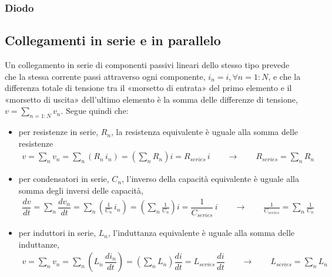 \documentclass[letterpaper,10pt,italian]{jupyterBook}
\begin{document}
\subsubsection{Diodo}
\label{\detokenize{ch/electromagnetism/circuits-electric:diodo}}\label{\detokenize{ch/electromagnetism/circuits-electric:physics-hs-electromagnetism-circuits-electric-components-diode}}
\sphinxAtStartPar
{}


\subsection{Collegamenti in serie e in parallelo}
\label{\detokenize{ch/electromagnetism/circuits-electric:collegamenti-in-serie-e-in-parallelo}}\label{\detokenize{ch/electromagnetism/circuits-electric:physics-hs-electromagnetism-circuits-electric-components-configurations}}
\sphinxAtStartPar
{} Un collegamento in serie di componenti passivi lineari dello stesso tipo prevede che la stessa corrente passi attraverso ogni componente, \(i_n = i, \forall n=1:N\), e che la differenza totale di tensione tra il «morsetto di entrata» del primo elemento e il «morsetto di uscita» dell’ultimo elemento è la somma delle differenze di tensione, \(v = \sum_{n=1:N} v_n\). Segue quindi che:
\begin{itemize}
\item {} 
\sphinxAtStartPar
per resistenze in serie, \(R_n\), la resistenza equivalente è uguale alla somma delle resistenze
\begin{equation*}
\begin{split}v = \sum_n v_n = \sum_n \left( R_n \, i_n \right) = \left( \sum_n R_n \right) i = R_{series} \, i \qquad \rightarrow \qquad R_{series} = \sum_n R_n\end{split}
\end{equation*}
\item {} 
\sphinxAtStartPar
per condensatori in serie, \(C_n\), l’inverso della capacità equivalente è uguale alla somma degli inversi delle capacità,
\begin{equation*}
\begin{split}\dfrac{d v}{dt} = \sum_n \dfrac{d v_n}{dt} = \sum_n \left( \frac{1}{C_n} \, i_n \right) = \left( \sum_n \frac{1}{C_n} \right) i = \dfrac{1}{C_{series}} \, i \qquad \rightarrow \qquad \frac{1}{C_{series}} = \sum_n \frac{1}{C_n}\end{split}
\end{equation*}
\item {} 
\sphinxAtStartPar
per induttori in serie, \(L_n\), l’induttanza equivalente è uguale alla somma delle induttanze,
\begin{equation*}
\begin{split}v = \sum_n v_n = \sum_n \left( L_n \, \dfrac{d i_n}{d t} \right) = \left( \sum_n L_n \right) \dfrac{d i}{dt} = L_{series} \, \dfrac{d i}{dt} \qquad \rightarrow \qquad L_{series} = \sum_n L_n\end{split}
\end{equation*}
\end{itemize}
\end{document}
